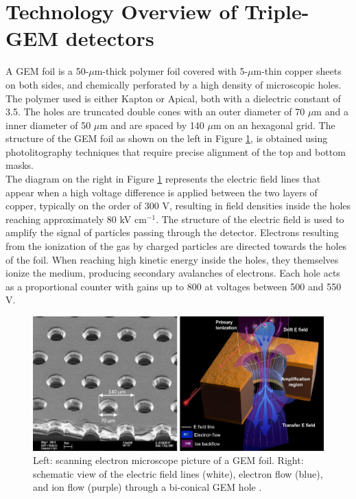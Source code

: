   \section{Technology Overview of Triple-GEM detectors}

    A GEM foil is a 50-$\mu$m-thick polymer foil covered with 5-$\mu$m-thin copper sheets on both sides, and chemically perforated by a high density of microscopic holes. The polymer used is either Kapton or Apical, both with a dielectric constant of 3.5. The holes are truncated double cones with an outer diameter of 70 $\mu$m and a inner diameter of 50 $\mu$m and are spaced by 140 $\mu$m on an hexagonal grid. The structure of the GEM foil as shown on the left in Figure \ref{fig:II-1-holes}, is obtained using photolitography techniques that require precise alignment of the top and bottom masks. \\

    The diagram on the right in Figure \ref{fig:II-1-holes} represents the electric field lines that appear when a high voltage difference is applied between the two layers of copper, typically on the order of 300 V, resulting in field densities inside the holes reaching approximately 80 kV cm$^{-1}$. The structure of the electric field is used to amplify the signal of particles passing through the detector. Electrons resulting from the ionization of the gas by charged particles are directed towards the holes of the foil. When reaching high kinetic energy inside the holes, they themselves ionize the medium, producing secondary avalanches of electrons. Each hole acts as a proportional counter with gains up to 800 at voltages between 500 and 550 V.  \\

    \begin{figure}[h!]
      \centering
      \includegraphics[width=\textwidth]{img/II-1-gem/holes.pdf}
      \caption{Left: scanning electron microscope picture of a GEM foil. Right: schematic view of the electric field lines (white), electron flow (blue), and ion flow (purple) through a bi-conical GEM hole \cite{Colaleo:2021453}.}
      \label{fig:II-1-holes}
    \end{figure}

